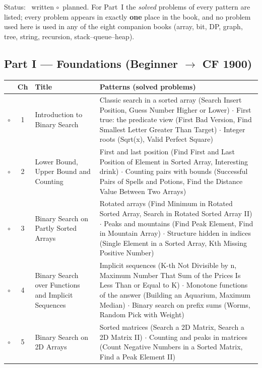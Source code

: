 Status: \yes~written \quad $\circ$~planned. For Part~I the \emph{solved} problems of every pattern are listed; every problem appears in exactly \textbf{one} place in the book, and no problem used here is used in any of the eight companion books (array, bit, DP, graph, tree, string, recursion, stack--queue--heap).

\begingroup
\small
\renewcommand{\arraystretch}{1.25}

\subsection*{Part I --- Foundations (Beginner $\to$ CF 1900)}
\begin{tabularx}{\linewidth}{@{}c c >{\raggedright\arraybackslash}p{3.6cm} X@{}}
\toprule
& \textbf{Ch} & \textbf{Title} & \textbf{Patterns (solved problems)} \\
\midrule
$\circ$ & 1 & Introduction to Binary Search & Classic search in a sorted array (Search Insert Position, Guess Number Higher or Lower) $\cdot$ First true: the predicate view (First Bad Version, Find Smallest Letter Greater Than Target) $\cdot$ Integer roots (Sqrt(x), Valid Perfect Square) \\
$\circ$ & 2 & Lower Bound, Upper Bound and Counting & First and last position (Find First and Last Position of Element in Sorted Array, Interesting drink) $\cdot$ Counting pairs with bounds (Successful Pairs of Spells and Potions, Find the Distance Value Between Two Arrays) \\
$\circ$ & 3 & Binary Search on Partly Sorted Arrays & Rotated arrays (Find Minimum in Rotated Sorted Array, Search in Rotated Sorted Array II) $\cdot$ Peaks and mountains (Find Peak Element, Find in Mountain Array) $\cdot$ Structure hidden in indices (Single Element in a Sorted Array, Kth Missing Positive Number) \\
$\circ$ & 4 & Binary Search over Functions and Implicit Sequences & Implicit sequences (K-th Not Divisible by n, Maximum Number That Sum of the Prices Is Less Than or Equal to K) $\cdot$ Monotone functions of the answer (Building an Aquarium, Maximum Median) $\cdot$ Binary search on prefix sums (Worms, Random Pick with Weight) \\
$\circ$ & 5 & Binary Search on 2D Arrays & Sorted matrices (Search a 2D Matrix, Search a 2D Matrix II) $\cdot$ Counting and peaks in matrices (Count Negative Numbers in a Sorted Matrix, Find a Peak Element II) \\
\bottomrule
\end{tabularx}

